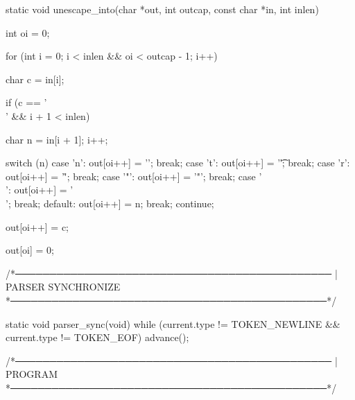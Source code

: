 \documentclass{article}
\begin{document}
static void unescape_into(char *out, int outcap, const char *in, int inlen)
{
    int oi = 0;

    for (int i = 0; i < inlen && oi < outcap - 1; i++) {
        char c = in[i];

        if (c == '\\' && i + 1 < inlen) {
            char n = in[i + 1];
            i++;

            switch (n) {
                case 'n':  out[oi++] = '\n'; break;
                case 't':  out[oi++] = '\t'; break;
                case 'r':  out[oi++] = '\r'; break;
                case '"':  out[oi++] = '"';  break;
                case '\\': out[oi++] = '\\'; break;
                default:
                    out[oi++] = n;
                    break;
            }
            continue;
        }

        out[oi++] = c;
    }

    out[oi] = 0;
}






/*──────────────────────────────────────────────
 | PARSER SYNCHRONIZE
 *──────────────────────────────────────────────*/







static void parser_sync(void)
{
    while (current.type != TOKEN_NEWLINE &&
           current.type != TOKEN_EOF)
    {
        advance();
    }
}








/*──────────────────────────────────────────────
 | PROGRAM
 *──────────────────────────────────────────────*/
\end{document}
